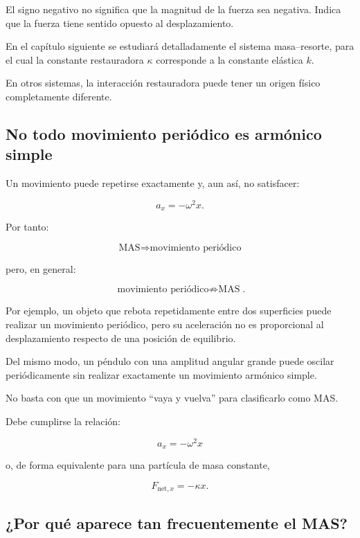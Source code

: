 El signo negativo no significa que la magnitud de la fuerza sea negativa. Indica que la fuerza tiene sentido opuesto al desplazamiento.

\begin{observacion}
En el capítulo siguiente se estudiará detalladamente el sistema masa--resorte, para el cual la constante restauradora \(\kappa\) corresponde a la constante elástica \(k\).

En otros sistemas, la interacción restauradora puede tener un origen físico completamente diferente.
\end{observacion}

\subsection{No todo movimiento periódico es armónico simple}

Un movimiento puede repetirse exactamente y, aun así, no satisfacer:

\[ a_x=-\omega^2x. \]

Por tanto:

\[ \boxed{\text{MAS}\Longrightarrow\text{movimiento periódico}} \]

pero, en general:

\[ \boxed{\text{movimiento periódico}\not\Longrightarrow\text{MAS}}. \]

Por ejemplo, un objeto que rebota repetidamente entre dos superficies puede realizar un movimiento periódico, pero su aceleración no es proporcional al desplazamiento respecto de una posición de equilibrio.

Del mismo modo, un péndulo con una amplitud angular grande puede oscilar periódicamente sin realizar exactamente un movimiento armónico simple.

\begin{errorfrecuente}
No basta con que un movimiento ``vaya y vuelva'' para clasificarlo como MAS.

Debe cumplirse la relación:

\[ a_x=-\omega^2x \]

o, de forma equivalente para una partícula de masa constante,

\[ F_{\text{net},x}=-\kappa x. \]
\end{errorfrecuente}

\subsection{¿Por qué aparece tan frecuentemente el MAS?}

